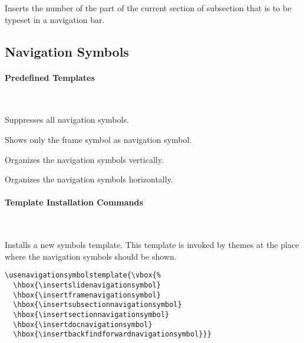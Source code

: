 \begin{command}{\insertpartheadnumber}
  Inserts the number of the part of the current section of subsection
  that is to be typeset in a navigation bar. 
\end{command}





\subsection{Navigation Symbols}
\label{section-navigation-symbols-template}

\paragraph{Predefined Templates}\ 

\begin{command}{\beamertemplatenavigationsymbolsempty}
  Suppresses all navigation symbols.
\end{command}

\begin{command}{\beamertemplatenavigationsymbolsframe}
  Shows only the frame symbol as navigation symbol.
\end{command}

\begin{command}{\beamertemplatenavigationsymbolsvertical}
  Organizes the navigation symbols vertically.
\end{command}

\begin{command}{\beamertemplatenavigationsymbolshorizontal}
  Organizes the navigation symbols horizontally.
\end{command}



\paragraph{Template Installation Commands}\ 

\begin{command}{\usenavigationsymbolstemplate{}}
  Installs a new symbols template. This template is invoked by themes
  at the place where the navigation symbols should be shown.
  \example
\begin{verbatim}
\usenavigationsymbolstemplate{\vbox{%
  \hbox{\insertslidenavigationsymbol}
  \hbox{\insertframenavigationsymbol}
  \hbox{\insertsubsectionnavigationsymbol}
  \hbox{\insertsectionnavigationsymbol}
  \hbox{\insertdocnavigationsymbol}
  \hbox{\insertbackfindforwardnavigationsymbol}}}
\end{verbatim}
\end{command}


